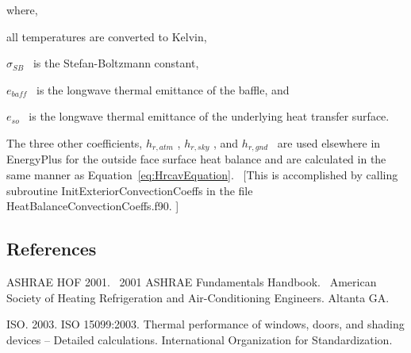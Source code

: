 where,

all temperatures are converted to Kelvin,

\({\sigma_{SB}}\) ~is the Stefan-Boltzmann constant,

\({e_{baff}}\) ~is the longwave thermal emittance of the baffle, and

\({e_{so}}\) ~is the longwave thermal emittance of the underlying heat transfer surface.

The three other coefficients, \({h_{r,atm}}\) , \({h_{r,sky}}\) , and \({h_{r,gnd}}\) ~are used elsewhere in EnergyPlus for the outside face surface heat balance and are calculated in the same manner as Equation~\ref{eq:HrcavEquation}.~ {[}This is accomplished by calling subroutine InitExteriorConvectionCoeffs in the file HeatBalanceConvectionCoeffs.f90. {]}

\subsection{References}\label{references-023}

ASHRAE HOF 2001.~ 2001 ASHRAE Fundamentals Handbook.~ American Society of Heating Refrigeration and Air-Conditioning Engineers. Altanta GA.

ISO. 2003. ISO 15099:2003. Thermal performance of windows, doors, and shading devices -- Detailed calculations. International Organization for Standardization.

